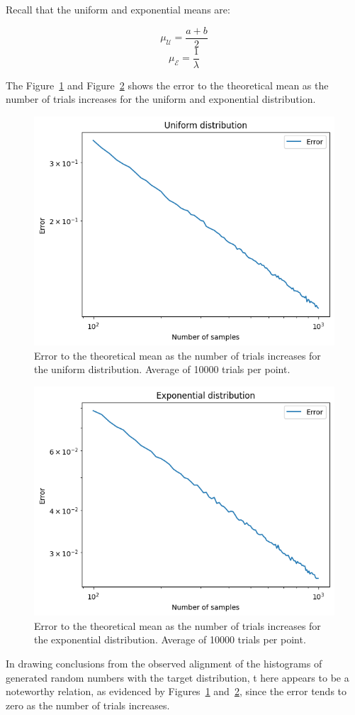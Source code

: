 \documentclass{article}
\begin{document}
Recall that the uniform and exponential means are:

\begin{equation*} \mu_{\mathcal{U}} = \frac{a + b}{2} \end{equation*}
\begin{equation*} \mu_{\mathcal{E}} = \frac{1}{\lambda} \end{equation*}

The Figure~\ref{fig:uniformerrorcdf} and Figure~\ref{fig:exponentialerrorcdf} shows the error to the theoretical mean as the number of trials increases for the uniform and exponential distribution.

\begin{figure}[H]
	\centering
	\includegraphics[width=0.5\linewidth]{./Figures/InverseCDF/uniform_error.png}
	\caption{Error to the theoretical mean as the number of trials increases for the uniform distribution. Average of 10000 trials per point.}
	\label{fig:uniformerrorcdf}
\end{figure}

\begin{figure}[H]
	\centering
	\includegraphics[width=0.5\linewidth]{./Figures/InverseCDF/exponential_error.png}
	\caption{Error to the theoretical mean as the number of trials increases for the exponential distribution. Average of 10000 trials per point.}
	\label{fig:exponentialerrorcdf}
\end{figure}

In drawing conclusions from the observed alignment of the histograms of generated random numbers with the target distribution, t  here appears to be a noteworthy relation, as evidenced by Figures~\ref{fig:uniformerrorcdf} and~\ref{fig:exponentialerrorcdf}, since the error tends to zero as the number of trials increases.
\end{document}
